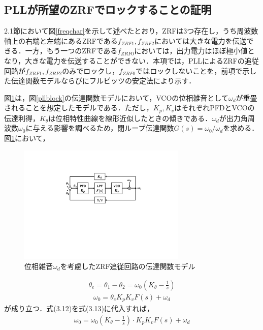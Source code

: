 \subsection{PLLが所望のZRFでロックすることの証明}
2.1節において図\ref{freqchar}を示して述べたとおり，ZRFは3つ存在し，うち周波数軸上の右端と左端にあるZRFである$f_{ZRF1}, f_{ZRF2}$においては大きな電力を伝送できる．一方，もう一つのZRFである$f_{ZRF0}$においては，出力電力はほぼ極小値となり，大きな電力を伝送することができない．本項では，PLLによるZRFの追従回路が$f_{ZRF1}, f_{ZRF2}$のみでロックし，$f_{ZRF0}$ではロックしないことを，前項で示した伝達関数モデルならびにフルビッツの安定法により示す．\par 
図\ref{pllmodel2}は，図\ref{pllblock}の伝達関数モデルにおいて，VCOの位相雑音として$\omega_d$が重畳されることを想定したモデルである．ただし，$K_p,K_v$はそれぞれPFDとVCOの伝達利得，$K_\theta$は位相特性曲線を線形近似したときの傾きである．$\omega_d$が出力角周波数$\omega_0$に与える影響を調べるため，閉ループ伝達関数$G(s)=\omega_0/\omega_d$を求める．図\ref{pllmodel2}において，
\begin{figure}[b]
\begin{center}

\includegraphics[width=80mm]{figures/pllmodel2.pdf}
\caption{位相雑音$\omega_d$を考慮したZRF追従回路の伝達関数モデル}
\label{pllmodel2}

\end{center}
\end{figure}
\begin{align}
\theta_e=\theta_1-\theta_2=\omega_0 \left(K_\theta-\frac{1}{s} \right) 
\end{align}
\begin{align}
\omega_0=\theta_e K_p K_v F(s)+ \omega_d
\end{align}
が成り立つ．式(3.12)を式(3.13)に代入すれば，
\begin{align}
\omega_0=\omega_0 \left(K_\theta-\frac{1}{s} \right) \cdot K_p K_v F(s)+\omega_d
\end{align}
